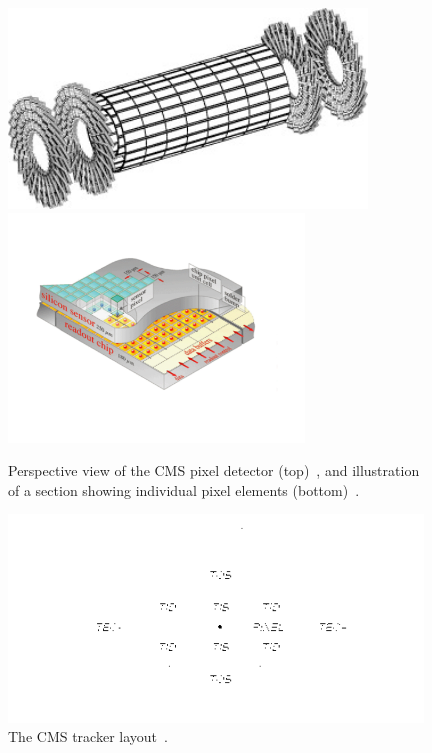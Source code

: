 \begin{figure}
\begin{center}
  \includegraphics[width=0.85\textwidth,keepaspectratio]{plots_and_figures/chapter3/pixeldet.jpg}
  \\
  \includegraphics[width=0.7\textwidth,keepaspectratio]{plots_and_figures/chapter3/pixelelem.pdf}
\caption{Perspective view of the CMS pixel detector (top)~\cite{pix_det}, and illustration of a section showing individual pixel elements (bottom)~\cite{pix_elem}.}
\label{fig:pix_det}
\end{center}
\end{figure}


\begin{figure}
\begin{center}
  \includegraphics[width=0.98\textwidth,keepaspectratio]{plots_and_figures/chapter3/trackerlayout.png}
\caption{The CMS tracker layout~\cite{cms_exp_ref}.}
\label{fig:tracker_layout}
\end{center}
\end{figure}

